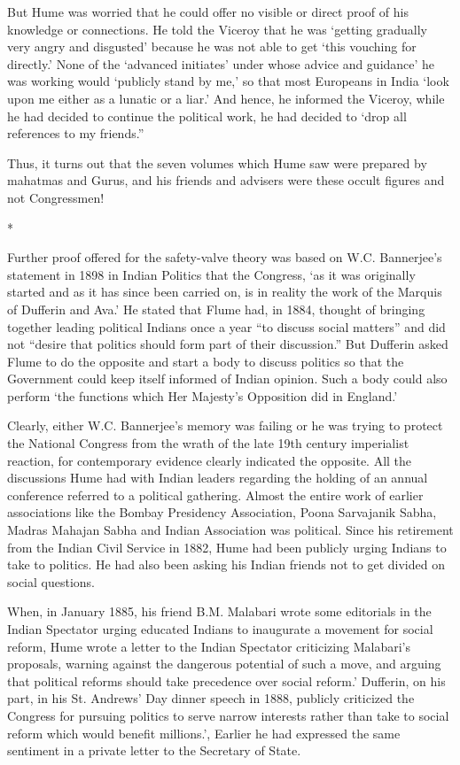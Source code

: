But Hume was worried that he could offer no visible or direct proof of his knowledge or connections. He told the Viceroy that he was ‘getting gradually very angry and disgusted’ because he was not able to get ‘this vouching for directly.’ None of the ‘advanced initiates’ under whose advice and guidance’ he was working would ‘publicly stand by me,’ so that most Europeans in India ‘look upon me either as a lunatic or a liar.’ And hence, he informed the Viceroy, while he had decided to continue the political work, he had decided to ‘drop all references to my friends.”

Thus, it turns out that the seven volumes which Hume saw were prepared by mahatmas and Gurus, and his friends and advisers were these occult figures and not Congressmen!

\begin{center}*\end{center}

Further proof offered for the safety-valve theory was based on W.C. Bannerjee’s statement in 1898 in Indian Politics that the Congress, ‘as it was originally started and as it has since been carried on, is in reality the work of the Marquis of Dufferin and Ava.’ He stated that Flume had, in 1884, thought of bringing together leading political Indians once a year “to discuss social matters” and did not “desire that politics should form part of their discussion.” But Dufferin asked Flume to do the opposite and start a body to discuss politics so that the Government could keep itself informed of Indian opinion. Such a body could also perform ‘the functions which Her Majesty’s Opposition did in England.’

Clearly, either W.C. Bannerjee’s memory was failing or he was trying to protect the National Congress from the wrath of the late 19th century imperialist reaction, for contemporary evidence clearly indicated the opposite. All the discussions Hume had with Indian leaders regarding the holding of an annual conference referred to a political gathering. Almost the entire work of earlier associations like the Bombay Presidency Association, Poona Sarvajanik Sabha, Madras Mahajan Sabha and Indian Association was political. Since his retirement from the Indian Civil Service in 1882, Hume had been publicly urging Indians to take to politics. He had also been asking his Indian friends not to get divided on social questions.

When, in January 1885, his friend B.M. Malabari wrote some editorials in the Indian Spectator urging educated Indians to inaugurate a movement for social reform, Hume wrote a letter to the Indian Spectator criticizing Malabari’s proposals, warning against the dangerous potential of such a move, and arguing that political reforms should take precedence over social reform.’ Dufferin, on his part, in his St. Andrews’ Day dinner speech in 1888, publicly criticized the Congress for pursuing politics to serve narrow interests rather than take to social reform which would benefit millions.’, Earlier he had expressed the same sentiment in a private letter to the Secretary of State.

